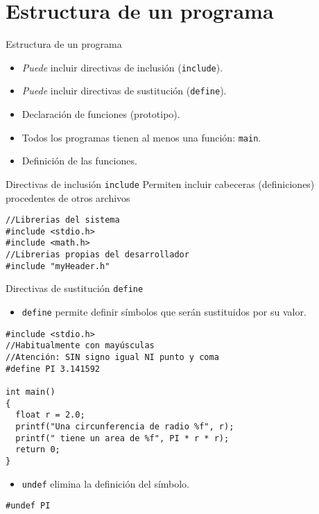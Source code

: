 \documentclass[xcolor={usenames,svgnames,dvipsnames}, aspectratio=169]{beamer}
\begin{document}
\section{Estructura de un programa}
\label{sec:orgfd8b3e2}

\begin{frame}[label={sec:org49ae446},fragile]{Estructura de un programa}
 \begin{itemize}
\item \emph{Puede} incluir directivas de inclusión (\texttt{include}).
\item \emph{Puede} incluir directivas de sustitución (\texttt{define}).
\item Declaración de funciones (prototipo).
\item Todos los programas tienen al menos una función: \texttt{main}.
\item Definición de las funciones.
\end{itemize}
\end{frame}


\begin{frame}[label={sec:orgce2e879},fragile]{Directivas de inclusión \texttt{include}}
 Permiten incluir cabeceras (definiciones) procedentes de otros archivos

\lstset{language=C,label= ,caption= ,captionpos=b,numbers=none}
\begin{lstlisting}
//Librerias del sistema
#include <stdio.h>
#include <math.h>
//Librerias propias del desarrollador
#include "myHeader.h"
\end{lstlisting}
\end{frame}


\begin{frame}[label={sec:org542126c},fragile]{Directivas de sustitución \texttt{define}}
 \begin{itemize}
\item \texttt{define} permite definir símbolos que serán sustituidos por su valor.
\end{itemize}
\lstset{language=C,label= ,caption= ,captionpos=b,numbers=none}
\begin{lstlisting}
#include <stdio.h>
//Habitualmente con mayúsculas
//Atención: SIN signo igual NI punto y coma
#define PI 3.141592

int main()
{
  float r = 2.0;
  printf("Una circunferencia de radio %f", r);
  printf(" tiene un area de %f", PI * r * r);
  return 0;
}
\end{lstlisting}

\begin{itemize}
\item \texttt{undef} elimina la definición del símbolo.
\end{itemize}
\lstset{language=C,label= ,caption= ,captionpos=b,numbers=none}
\begin{lstlisting}
#undef PI
\end{lstlisting}
\end{frame}
\end{document}
